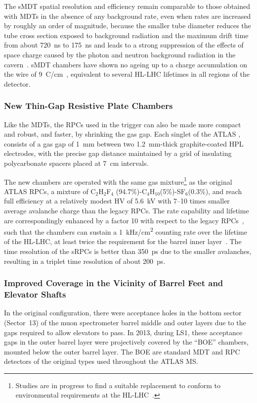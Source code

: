 \documentclass[cernpreprint, atlasdraft=false, UKenglish,british,orcidlogo, texmf, orcidlogo]{atlasdoc}
\begin{document}
The \gls{sMDT} spatial resolution and efficiency remain comparable to those obtained with \glspl{MDT} in the absence of any background rate, even when rates are increased by roughly an order of magnitude,
because the smaller tube diameter reduces the tube cross section exposed to background radiation and the maximum drift time from about \SI{720}{\ns} to \SI{175}{\ns} 
and leads to a strong suppression of the effects of
space charge caused by the photon and neutron background radiation in the cavern~\cite{sMDT1,sMDT2}. \gls{sMDT} chambers have shown no ageing up to a charge accumulation on the wire of \SI{9}{\coulomb/\cm}~\cite{sMDT1,sMDT2}, equivalent to several \gls{HL-LHC} lifetimes in all regions of the detector.
 
\subsubsection{New Thin-Gap Resistive Plate Chambers \label{muonSS:srpc}}
Like the \glspl{MDT}, the \glspl{RPC} used in the trigger can also be made more compact and robust, and faster, by shrinking the gas gap.
Each singlet of the ATLAS , consists of a gas gap of \SI{1}{\mm} between two \SI{1.2}{\mm}-thick graphite-coated \gls{HPL} electrodes,
with the precise gap distance maintained by a grid of insulating polycarbonate spacers placed at \SI{7}{\cm} intervals.
 
The new chambers are operated with the same gas mixture\footnote{Studies are in progress to find a suitable replacement to conform to environmental requirements at the \gls{HL-LHC}~\cite{Mandelli:2021zxi}.}
as the original ATLAS \glspl{RPC}, a mixture of C$_2$H$_2$F$_4$ (94.7\%)-C$_4$H$_{10}$(5\%)-SF$_6$(0.3\%), 
and reach full efficiency at a relatively modest \gls{HV} of \SI{5.6}{\kV}
with \numrange{7}{10} times smaller average avalanche charge than the
legacy \glspl{RPC}. 
The rate capability and lifetime are correspondingly enhanced by a factor 10 with respect to the legacy \glspl{RPC}~\cite{RPC_aging}, such that the chambers can sustain a \SI{1}{\kHz/\cm\squared} counting rate over the lifetime of the \gls{HL-LHC},
at least twice the requirement for the barrel inner layer~\cite{quanyin2018}. 
The time resolution of the \glspl{sRPC} is better than \SI{350}{\ps}  
due to the smaller avalanches, resulting in a triplet time resolution of about \SI{200}{\ps}.
 
 
\subsubsection{Improved Coverage in the Vicinity of Barrel Feet and Elevator Shafts\label{muonSS:BMEBOEBMG}}
In the original \RunOne configuration, there were acceptance holes in the bottom sector (Sector~13) 
of the muon spectrometer barrel middle and outer layers due to the gaps required to allow elevators to pass.
In 2013, during \gls{LS1}, these acceptance gaps in the outer barrel layer were projectively covered  by the ``BOE'' chambers, mounted below the outer barrel layer.
The BOE are standard \gls{MDT} and \gls{RPC} detectors of the original types used throughout the ATLAS \gls{MS}.
 
\end{document}
